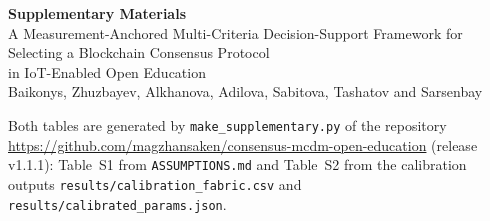 \documentclass[a4paper,10pt]{article}
\begin{document}
\begin{center}
{\large\bfseries Supplementary Materials}\\[4pt]
A Measurement-Anchored Multi-Criteria Decision-Support Framework for Selecting a Blockchain Consensus Protocol\\
in IoT-Enabled Open Education\\[4pt]
\small Baikonys, Zhuzbayev, Alkhanova, Adilova, Sabitova, Tashatov and Sarsenbay
\end{center}
\noindent Both tables are generated by \texttt{make\_supplementary.py} of the repository
\url{https://github.com/magzhansaken/consensus-mcdm-open-education} (release v1.1.1): Table~S1 from
\texttt{ASSUMPTIONS.md} and Table~S2 from the calibration outputs \texttt{results/calibration\_fabric.csv} and
\texttt{results/calibrated\_params.json}.
\end{document}
